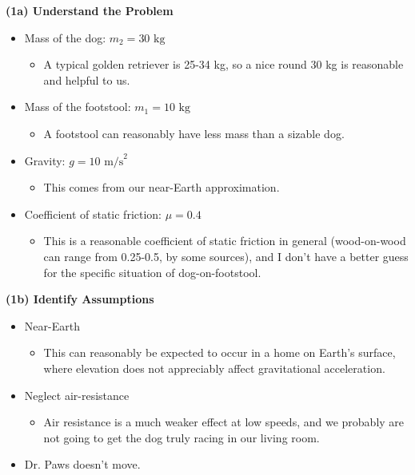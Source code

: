 \documentclass[]{article}
\begin{document}
\begin{TeacherMargin}
\noindent\textbf{(1a) Understand the Problem}
\begin{itemize}
	\item Mass of the dog: $m_{2}=30\text{ kg}$
	\begin{itemize}
		\item A typical golden retriever is 25-34 kg, so a nice round 30 kg is reasonable and helpful to us.
	\end{itemize}
	\item Mass of the footstool: $m_{1}=10\text{ kg}$
	\begin{itemize}
		\item A footstool can reasonably have less mass than a sizable dog.
	\end{itemize}
	\item Gravity: $g=10\text{ m/s}^{2}$
	\begin{itemize}
		\item This comes from our near-Earth approximation.
	\end{itemize}
	\item Coefficient of static friction: $\mu=0.4$
	\begin{itemize}
		\item This is a reasonable coefficient of static friction in general (wood-on-wood can range from 0.25-0.5, by some sources), and I don't have a better guess for the specific situation of dog-on-footstool.
	\end{itemize}
\end{itemize}
\textbf{(1b) Identify Assumptions}
\begin{itemize}
	\item Near-Earth
	\begin{itemize}
		\item This can reasonably be expected to occur in a home on Earth's surface, where elevation does not appreciably affect gravitational acceleration.
	\end{itemize}
	\item Neglect air-resistance
	\begin{itemize}
		\item Air resistance is a much weaker effect at low speeds, and we probably are not going to get the dog truly racing in our living room.
	\end{itemize}
	\item Dr. Paws doesn't move.
	\begin{itemize}

\end{itemize}
\end{itemize}
\end{TeacherMargin}
\end{document}
